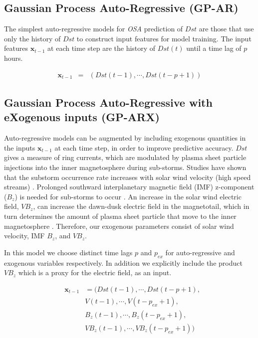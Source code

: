 \documentclass[referee,a4paper,12pt,traditabstract]{swsc}
\begin{document}
\begin{linenumbers}
\subsection{Gaussian Process Auto-Regressive (GP-AR)} \label{sec:gpar}

The simplest auto-regressive models for \emph{OSA} prediction of $Dst$ are those that use only the history of $Dst$ to construct input features for model training. The input features $\mathbf{x}_{t-1}$ at each time step are the history of $Dst(t)$ until a time lag of $p$ hours.

\begin{eqnarray*}
    \mathbf{x}_{t-1} & = & \left(Dst(t-1), \cdots , Dst(t-p+1)\right)
\end{eqnarray*}

\subsection{Gaussian Process Auto-Regressive with eXogenous inputs (GP-ARX)} \label{sec:gparx}

Auto-regressive models can be augmented by including exogenous quantities in the inputs $\mathbf{x}_{t-1}$ at each time step, in order to improve predictive accuracy. $Dst$ gives a measure of ring currents, which are modulated by plasma sheet particle injections into the inner magnetosphere during sub-storms. Studies have shown that the substorm occurrence rate increases with solar wind velocity (high speed streams) \citep{Kissinger2011,Newell2016}. Prolonged southward interplanetary magnetic field (IMF) z-component ($B_z$) is needed for sub-storms to occur \citep{McPherron1986}. An increase in the solar wind electric field, $VB_z$, can increase the dawn-dusk electric field in the magnetotail, which in turn determines the amount of plasma sheet particle that move to the inner magnetosphere \citep{Friedel2001}. Therefore, our exogenous parameters consist of solar wind velocity, IMF $B_z$, and $VB_z$.   

In this model we choose distinct time lags $p$ and $p_{ex}$ for auto-regressive and exogenous variables respectively. In addition we explicitly include the product $V B_z$ which is a proxy for the electric field, as an input.
    
\begin{eqnarray*}
        & \mathbf{x}_{t-1} & = (Dst(t-1), \cdots , Dst(t-p+1), \\
        & \ \ \ \ \ & V(t-1), \cdots, V(t-p_{ex}+1),\\
        & \ \ \ \ \ & B_{z}(t-1), \cdots, B_{z}(t-p_{ex}+1),\\
        & \ \ \ \ \ & V B_{z}(t-1), \cdots, V B_{z}(t-p_{ex}+1))
\end{eqnarray*}


\end{linenumbers}
\end{document}

